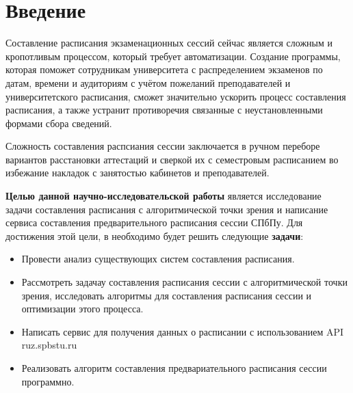 \chapter*{Введение} %

Составление расписания экзаменационных сессий сейчас является сложным и кропотливым процессом, который требует автоматизации. Создание программы, которая поможет сотрудникам университета с распределением экзаменов по датам, времени и аудиториям с учётом пожеланий преподавателей и университетского расписания, сможет значительно ускорить процесс составления расписания, а также устранит противоречия связанные с неустановленными формами сбора сведений. 

Сложность составления распсиания сессии заключается в ручном переборе вариантов расстановки аттестаций и сверкой их с семестровым расписанием во избежание накладок с занятостью кабинетов и преподавателей. 

\begin{comment}
\textbf{Целью данной работы} является написание системы составления предварительного расписания сессии СПбПу.
Для достижения этой цели, в необходимо будет решить следующие \textbf{задачи}:

\begin{itemize}
	\item Провести анализ существующих систем составления расписания.
	\item Рассмотреть применимость различных алгоритмов для составления расписания сессии и оптимизации этого процесса.
	\item Написать сервис для получения данных о расписании с использованием API ruz.spbstu.ru
	\item Разработать сервис, находящий возможные варианты расписания сессиии на основе полученных сведений.
\end{itemize}
\end{comment}
\textbf{Целью данной научно-исследовательской работы} является исследование задачи составления расписания с алгоритмической точки зрения и написание сервиса составления предварительного расписания сессии СПбПу.
Для достижения этой цели, в необходимо будет решить следующие \textbf{задачи}:

\begin{itemize}
	\item Провести анализ существующих систем составления расписания.
	\item Рассмотреть задачау составления расписания сессии с алгоритмической точки зрения, исследовать алгоритмы для составления расписания сессии и оптимизации этого процесса.
	\item Написать сервис для получения данных о расписании с использованием API ruz.spbstu.ru
	\item Реализовать алгоритм составления предвариательного расписания сессии программно.
\end{itemize}

